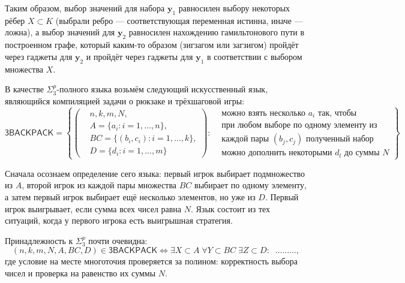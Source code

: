 Таким образом, выбор значений для набора $\mathbf{y}_1$ равносилен выбору некоторых рёбер $X \subset K$ (выбрали ребро --- соответствующая переменная истинна, иначе --- ложна), а выбор значений для $\mathbf{y}_2$ равносилен нахождению гамильтонового пути в построенном графе, который каким-то образом (зигзагом или загзигом) пройдёт через гаджеты для $\mathbf{y}_2$ и пройдёт через гаджеты для $\mathbf{y}_1$ в соответствии с выбором множества $X$.

В качестве $\Sigma_3^p$-полного языка возьмём следующий искусственный язык, являющийся компиляцией задачи о рюкзаке и трёхшаговой игры:
\[
\textsf{3BACKPACK} = \left\{
\left(
\begin{aligned}
&n, k, m, N,\\
&A = \{a_i\colon i = 1, \ldots, n\},\\
&BC = \{(b_i, c_i)\colon i = 1, \ldots, k\},\\
&D = \{d_i\colon i = 1, \ldots, m\}
\end{aligned}
\right)
\colon
\begin{aligned}
    &\text{можно взять несколько $a_i$ так, чтобы}\\
    &\text{при любом выборе по одному элементу из}\\
    &\text{каждой пары $(b_j, c_j)$ полученный набор}\\
    &\text{можно дополнить некоторыми $d_l$ до суммы $N$}
\end{aligned}
\right\}
\]

Сначала осознаем определение сего языка: первый игрок выбирает подмножество из $A$, второй игрок из каждой пары множества $BC$ выбирает по одному элементу, а затем первый игрок выбирает ещё несколько элементов, но уже из $D$. Первый игрок выигрывает, если сумма всех чисел равна $N$. Язык состоит из тех ситуаций, когда у первого игрока есть выигрышная стратегия.

Принадлежность к $\Sigma_3^p$ почти очевидна: 
\[
    (n, k, m, N, A, BC, D)\in\textsf{3BACKPACK} \Longleftrightarrow  \exists {X \subset A}\;\forall {Y \subset BC}\;\exists {Z \subset D}\colon\;\; \ldots\ldots\ldots,
\]
где условие на месте многоточия проверяется за полином: корректность выбора чисел и проверка на равенство их суммы $N$. 

